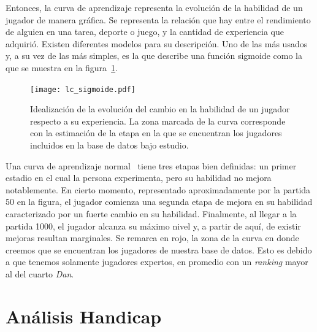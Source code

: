 \documentclass[11pt,twoside,spanish]{report} %
\begin{document}
Entonces, la curva de aprendizaje representa la evoluci\'on de la habilidad de un jugador de manera gr\'afica.
Se representa la relaci\'on que hay entre el rendimiento de alguien en una tarea, deporte o juego, y la cantidad de experiencia que adquiri\'o.
Existen diferentes modelos para su descripci\'on.
Uno de las m\'as usados y, a su vez de las m\'as simples, es la que describe una funci\'on sigmoide como la que se muestra en la figura~\ref{fig:lc_sigmoide}.

\begin{figure}[H]
	\centering
	\texttt{[image: lc\_sigmoide.pdf]}
	\caption{Idealizaci\'on de la evoluci\'on del cambio en la habilidad de un jugador respecto a su experiencia. La zona marcada de la curva corresponde con la estimaci\'on de la etapa en la que se encuentran los jugadores incluidos en la base de datos bajo estudio.}
	\label{fig:lc_sigmoide}
\end{figure}


Una curva de aprendizaje normal~\cite{newell1981-skillAcquisitionAndLawOfPractice} tiene tres etapas bien definidas: un primer estadio en el cual la persona experimenta, pero su habilidad no mejora notablemente.
En cierto momento, representado aproximadamente por la partida 50 en la figura, el jugador comienza una segunda etapa de mejora en su habilidad caracterizado por un fuerte cambio en su habilidad.
Finalmente, al llegar a la partida 1000, el jugador alcanza su m\'aximo nivel y, a partir de aqu\'i, de existir mejoras resultan marginales.
Se remarca en rojo, la zona de la curva en donde creemos que se encuentran los jugadores de nuestra base de datos.
Esto es debido a que tenemos solamente jugadores expertos, en promedio con un \textit{ranking} mayor al del cuarto \textit{Dan}.




\section{An\'alisis Handicap}
\label{chap:handicap}

\end{document}
